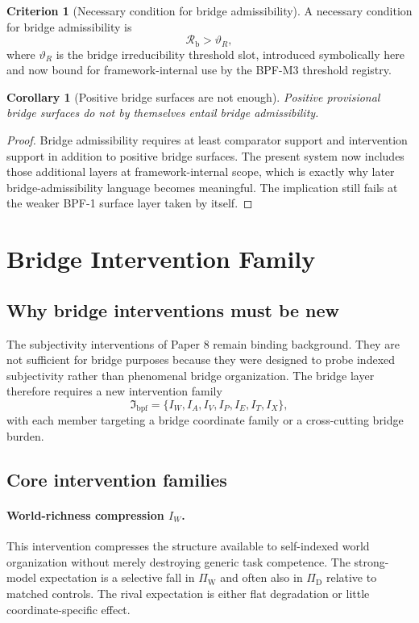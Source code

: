 \documentclass[11pt,a4paper]{article}
\newtheorem{corollary}[theorem]{Corollary}
\theoremstyle{definition}
\newtheorem{criterion}[theorem]{Criterion}
\newcommand{\PiD}{\Pi_{\mathrm{D}}}
\newcommand{\PiW}{\Pi_{\mathrm{W}}}
\newcommand{\BridgeIntervFam}{\mathfrak{I}_{\mathrm{bpf}}}
\newcommand{\BridgeMargin}{\mathcal{R}_{\mathrm{b}}}
\begin{document}
\begin{criterion}[Necessary condition for bridge admissibility]
A necessary condition for bridge admissibility is
\[
\BridgeMargin > \vartheta_R,
\]
where $\vartheta_R$ is the bridge irreducibility threshold slot, introduced symbolically here and now bound for framework-internal use by the BPF-M3 threshold registry.
\end{criterion}

\begin{corollary}[Positive bridge surfaces are not enough]
Positive provisional bridge surfaces do not by themselves entail bridge admissibility.
\end{corollary}

\begin{proof}
Bridge admissibility requires at least comparator support and intervention support in addition to positive bridge surfaces. The present system now includes those additional layers at framework-internal scope, which is exactly why later bridge-admissibility language becomes meaningful. The implication still fails at the weaker BPF-1 surface layer taken by itself.
\end{proof}

\section{Bridge Intervention Family}
\subsection{Why bridge interventions must be new}
The subjectivity interventions of Paper 8 remain binding background. They are not sufficient for bridge purposes because they were designed to probe indexed subjectivity rather than phenomenal bridge organization. The bridge layer therefore requires a new intervention family
\[
\BridgeIntervFam=
\{I_W,I_A,I_V,I_P,I_E,I_T,I_X\},
\]
with each member targeting a bridge coordinate family or a cross-cutting bridge burden.

\subsection{Core intervention families}

\paragraph{World-richness compression $I_W$.}
This intervention compresses the structure available to self-indexed world organization without merely destroying generic task competence. The strong-model expectation is a selective fall in $\PiW$ and often also in $\PiD$ relative to matched controls. The rival expectation is either flat degradation or little coordinate-specific effect.
\end{document}
